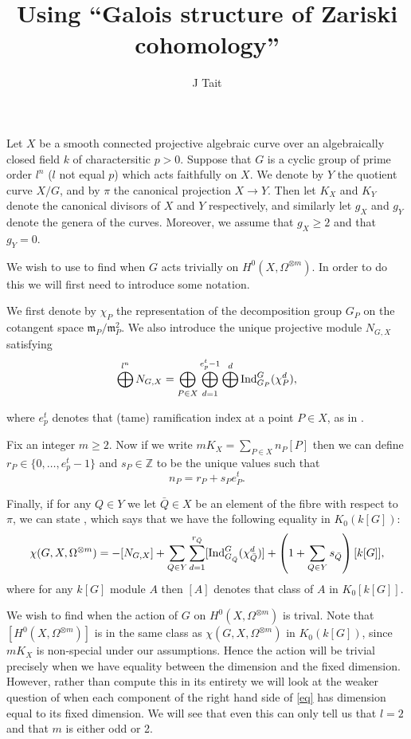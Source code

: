 \documentclass[11pt]{article} %
\title{Using ``Galois structure of Zariski cohomology''}
\author{J Tait}
\theoremstyle{remark}\newtheorem*{rem}{Remark}
\newcommand{\ZZ}{{\mathbb Z}}
\begin{document}
\maketitle
Let $X$ be a smooth connected projective algebraic curve over an algebraically closed field $k$ of charactersitic $p>0$.
Suppose that $G$ is a cyclic group of prime order $l^n$ ($l$ not equal $p$) which acts faithfully on $X$.
We denote by $Y$ the quotient curve $X/G$, and by $\pi$ the canonical projection $X\rightarrow Y$.
Then let $K_X$ and $K_Y$ denote the canonical divisors of $X$ and $Y$ respectively, and similarly let $g_X$ and $g_Y$ denote the genera of the curves.
Moreover, we assume that $g_X\geq 2$ and that $g_Y = 0$.


We wish to use \citep[Thm 4.5]{galoisstruc} to find when $G$ acts trivially on $H^0(X,\Omega^{\otimes m})$.
In order to do this we will first need to introduce some notation.

We first denote by $\chi_P$ the representation of the decomposition group $G_P$ on the cotangent space $\mathfrak{m}_P/\mathfrak{m}_P^2$.
We also introduce the unique projective module $N_{G,X}$ satisfying
\begin{equation*}
 \bigoplus^{l^n} N_{G,X} = \bigoplus_{P\in X} \bigoplus_{d=1}^{e^t_p-1} \bigoplus^d {\rm Ind}_{G_P}^G(\chi_P^d),
\end{equation*}

where $e^t_p$ denotes that (tame) ramification index at a point $P\in X$, as in \citep[Thm 4.3]{galoisstruc}.

Fix an integer $m\geq 2$. Now if we write $mK_X = \sum_{P\in X} n_P[P]$ then we can define $r_P\in \{0,\ldots, e^t_p - 1\}$ and $s_P\in \ZZ$ to be the unique values such that
\[
 n_P = r_P + s_Pe_P^t.
\]

Finally, if for any $Q\in Y$ we let $\bar Q \in X$ be an element of the fibre with respect to $\pi$, we can state \citep[Thm 4.5]{galoisstruc}, which says that we have the following equality in $K_0(k[G])$:
\begin{equation}\label{eq}
 \chi(G,X,\Omega^{\otimes m}) = -[N_{G,X}] +\sum_{Q\in Y}\sum^{r_{\bar Q}}_{d=1} [{\rm Ind}_{G_{\bar Q}}^G(\chi_{\bar Q}^d)]  + \left( 1 + \sum_{Q\in Y} s_{\bar Q} \right) [k[G]],
\end{equation}
where for any $k[G]$ module $A$ then $[A]$ denotes that class of $A$ in $K_0[k[G]]$.

We wish to find when the action of $G$ on $H^0(X,\Omega^{\otimes m})$ is trival.
Note that $[H^0(X,\Omega^{\otimes m})]$ is in the same class as $\chi(G,X,\Omega^{\otimes m})$ in $K_0(k[G])$, since $mK_X$ is non-special under our assumptions.
Hence the action will be trivial precisely when we have equality between the dimension and the fixed dimension.
However, rather than compute this in its entirety we will look at the weaker question of when each component of the right hand side of \ref{eq} has dimension equal to its fixed dimension.
We will see that even this can only tell us that $l=2$ and that $m$ is either odd or 2.
\end{document}
